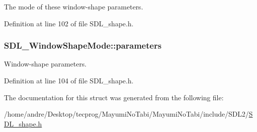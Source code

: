The mode of these window-\/shape parameters. 



Definition at line 102 of file S\-D\-L\-\_\-shape.\-h.

\hypertarget{struct_s_d_l___window_shape_mode_a2f79bb294034156207fa6d88d3a8c819}{
\subsubsection[{parameters}]{ S\-D\-L\-\_\-\-Window\-Shape\-Mode\-::parameters}}\label{struct_s_d_l___window_shape_mode_a2f79bb294034156207fa6d88d3a8c819}


Window-\/shape parameters. 



Definition at line 104 of file S\-D\-L\-\_\-shape.\-h.



The documentation for this struct was generated from the following file\-:\begin{DoxyCompactItemize}
\item 
/home/andre/\-Desktop/tecprog/\-Mayumi\-No\-Tabi/\-Mayumi\-No\-Tabi/include/\-S\-D\-L2/\hyperlink{_s_d_l__shape_8h}{S\-D\-L\-\_\-shape.\-h}\end{DoxyCompactItemize}
